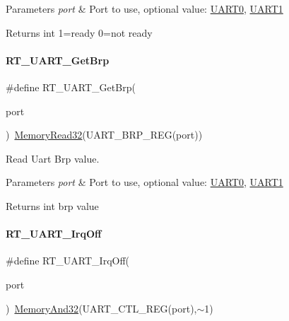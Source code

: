\begin{DoxyParams}{Parameters}
{\em port} & Port to use, optional value\+: \mbox{\hyperlink{a00056_a0508661f121639ffdee7de2353a0def2}{U\+A\+R\+T0}}, \mbox{\hyperlink{a00056_a8d69bf04d07af4fbbab5a8bd291f65ff}{U\+A\+R\+T1}} \\
\hline
\end{DoxyParams}
\begin{DoxyReturn}{Returns}
int 1=ready 0=not ready 
\end{DoxyReturn}
\mbox{\label{a00056_a74f1bca1f0b60eeec1f84bcba3e34919}} 
\paragraph{\texorpdfstring{R\+T\+\_\+\+U\+A\+R\+T\+\_\+\+Get\+Brp}{RT\_UART\_GetBrp}}
{\footnotesize\ttfamily \#define R\+T\+\_\+\+U\+A\+R\+T\+\_\+\+Get\+Brp(\begin{DoxyParamCaption}\item[{}]{port }\end{DoxyParamCaption})~\mbox{\hyperlink{a00020_a2d484dc15bdf30ee11ab3b05f31f0e16}{Memory\+Read32}}(U\+A\+R\+T\+\_\+\+B\+R\+P\+\_\+\+R\+EG(port))}



Read Uart Brp value. 


\begin{DoxyParams}{Parameters}
{\em port} & Port to use, optional value\+: \mbox{\hyperlink{a00056_a0508661f121639ffdee7de2353a0def2}{U\+A\+R\+T0}}, \mbox{\hyperlink{a00056_a8d69bf04d07af4fbbab5a8bd291f65ff}{U\+A\+R\+T1}} \\
\hline
\end{DoxyParams}
\begin{DoxyReturn}{Returns}
int brp value 
\end{DoxyReturn}
\mbox{\label{a00056_acf04f21e0b0f598ac00a1a08eb4e5f2e}} 
\paragraph{\texorpdfstring{R\+T\+\_\+\+U\+A\+R\+T\+\_\+\+Irq\+Off}{RT\_UART\_IrqOff}}
{\footnotesize\ttfamily \#define R\+T\+\_\+\+U\+A\+R\+T\+\_\+\+Irq\+Off(\begin{DoxyParamCaption}\item[{}]{port }\end{DoxyParamCaption})~\mbox{\hyperlink{a00020_ad87cedffcaadc51db22594fce55173d4}{Memory\+And32}}(U\+A\+R\+T\+\_\+\+C\+T\+L\+\_\+\+R\+EG(port),$\sim$1)}




